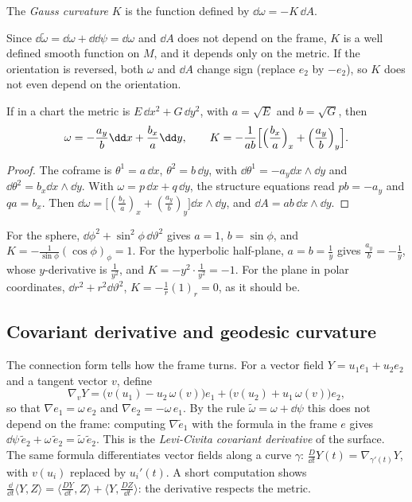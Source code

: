 \begin{definition}
The \emph{Gauss curvature} $K$ is the function defined by $\dd\omega=-K\,\dd A$.
\end{definition}

Since $\dd\tilde\omega=\dd\omega+\dd\dd\psi=\dd\omega$ and $\dd A$ does not depend on the frame, $K$ is a well defined smooth function on $M$, and it depends only on the metric.
If the orientation is reversed, both $\omega$ and $\dd A$ change sign (replace $e_2$ by $-e_2$), so $K$ does not even depend on the orientation.

\begin{proposition}\label{prop:orthocurv}
If in a chart the metric is $E\,\dd x^2+G\,\dd y^2$, with $a=\sqrt E$ and $b=\sqrt G$, then
\[
\omega=-\frac{a_y}b\dd x+\frac{b_x}a\dd y,\qquad K=-\frac1{ab}\Bigl[\Bigl(\frac{b_x}a\Bigr)_x+\Bigl(\frac{a_y}b\Bigr)_y\Bigr].
\]
\end{proposition}
\begin{proof}
The coframe is $\theta^1=a\,\dd x$, $\theta^2=b\,\dd y$, with $\dd\theta^1=-a_y\dd x\wedge\dd y$ and $\dd\theta^2=b_x\dd x\wedge\dd y$. With $\omega=p\,\dd x+q\,\dd y$, the structure equations read
$pb=-a_y$ and $qa=b_x$. Then $\dd\omega=\bigl[(\frac{b_x}a)_x+(\frac{a_y}b)_y\bigr]\dd x\wedge\dd y$, and $\dd A=ab\,\dd x\wedge\dd y$.
\end{proof}

\begin{example}\label{ex:curvexamples}
For the sphere, $\dd\phi^2+\sin^2\phi\,\dd\vartheta^2$ gives $a=1$, $b=\sin\phi$, and $K=-\frac1{\sin\phi}(\cos\phi)_\phi=1$. For the hyperbolic half-plane, $a=b=\frac1y$ gives
$\frac{a_y}b=-\frac1y$, whose $y$-derivative is $\frac1{y^2}$, and $K=-y^2\cdot\frac1{y^2}=-1$. For the plane in polar coordinates, $\dd r^2+r^2\dd\vartheta^2$, $K=-\frac1r(1)_r=0$, as it should be.
\end{example}

\subsection*{Covariant derivative and geodesic curvature}

The connection form tells how the frame turns. For a vector field $Y=u_1e_1+u_2e_2$ and a tangent vector $v$, define
\[
\nabla_vY=\bigl(v(u_1)-u_2\,\omega(v)\bigr)e_1+\bigl(v(u_2)+u_1\,\omega(v)\bigr)e_2,
\]
so that $\nabla e_1=\omega\,e_2$ and $\nabla e_2=-\omega\,e_1$. By the rule $\tilde\omega=\omega+\dd\psi$ this does not depend on the frame: computing $\nabla\tilde e_1$ with the formula in the frame $e$ gives
$\dd\psi\,\tilde e_2+\omega\,\tilde e_2=\tilde\omega\,\tilde e_2$. This is the \emph{Levi-Civita covariant derivative} of the surface. The same formula differentiates vector fields
along a curve $\gamma$: $\frac{D}{\dd t}Y(t)=\nabla_{\gamma'(t)}Y$, with $v(u_i)$ replaced by $u_i'(t)$. A short computation shows
$\frac{\dd}{\dd t}\langle Y,Z\rangle=\langle\frac{DY}{\dd t},Z\rangle+\langle Y,\frac{DZ}{\dd t}\rangle$: the derivative respects the metric.

